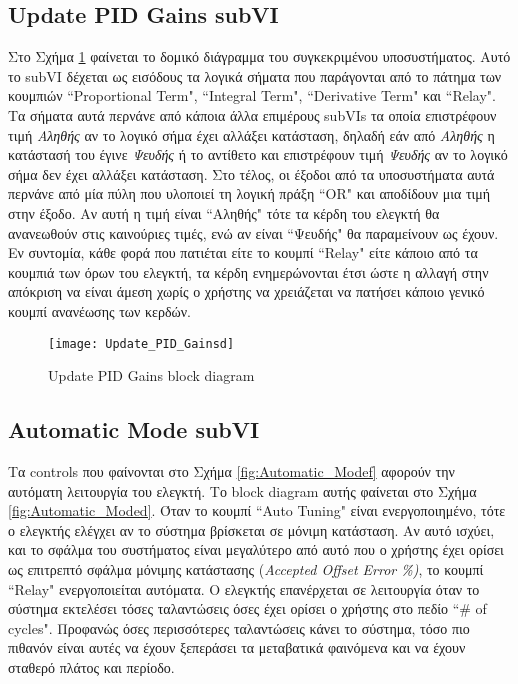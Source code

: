 \subsection{Update PID Gains subVI}

Στο Σχήμα \ref{fig:Update_PID_Gainsd} φαίνεται το δομικό διάγραμμα του συγκεκριμένου υποσυστήματος. Αυτό το subVI δέχεται ως εισόδους τα λογικά σήματα που παράγονται από το πάτημα των κουμπιών ``Proportional Term", ``Integral Term", ``Derivative Term" και ``Relay". Τα σήματα αυτά περνάνε από κάποια άλλα επιμέρους subVIs τα οποία επιστρέφουν τιμή \textit{Αληθής} αν το λογικό σήμα έχει αλλάξει κατάσταση, δηλαδή εάν από \textit{Αληθής} η κατάστασή του έγινε \textit{Ψευδής} ή το αντίθετο και επιστρέφουν τιμή \textit{Ψευδής} αν το λογικό σήμα δεν έχει αλλάξει κατάσταση. Στο τέλος, οι έξοδοι από τα υποσυστήματα αυτά περνάνε από μία πύλη που υλοποιεί τη λογική πράξη ``OR" και αποδίδουν μια τιμή στην έξοδο. Αν αυτή η τιμή είναι ``Αληθής" τότε τα κέρδη του ελεγκτή θα ανανεωθούν στις καινούριες τιμές, ενώ αν είναι ``Ψευδής" θα παραμείνουν ως έχουν. Εν συντομία, κάθε φορά που πατιέται είτε το κουμπί ``Relay" είτε κάποιο από τα κουμπιά των όρων του ελεγκτή, τα κέρδη ενημερώνονται έτσι ώστε η αλλαγή στην απόκριση να είναι άμεση χωρίς ο χρήστης να χρειάζεται να πατήσει κάποιο γενικό κουμπί ανανέωσης των κερδών.

\begin{figure}[h!]
  \centering
  \texttt{[image: Update\_PID\_Gainsd]}
  \caption{Update PID Gains block diagram}
  \label{fig:Update_PID_Gainsd}
\end{figure}

\subsection{Automatic Mode subVI}

Τα controls που φαίνονται στο Σχήμα \ref{fig:Automatic_Modef} αφορούν την αυτόματη λειτουργία του ελεγκτή. Το block diagram αυτής φαίνεται στο Σχήμα \ref{fig:Automatic_Moded}. Όταν το κουμπί ``Auto Tuning" είναι ενεργοποιημένο, τότε ο ελεγκτής ελέγχει αν το σύστημα βρίσκεται σε μόνιμη κατάσταση. Αν αυτό ισχύει, και το σφάλμα του συστήματος είναι μεγαλύτερο από αυτό που ο χρήστης έχει ορίσει ως επιτρεπτό σφάλμα μόνιμης κατάστασης (\emph{Accepted Offset Error \%)}, το κουμπί ``Relay" ενεργοποιείται αυτόματα. Ο ελεγκτής επανέρχεται σε λειτουργία όταν το σύστημα εκτελέσει τόσες ταλαντώσεις όσες έχει ορίσει ο χρήστης στο πεδίο ``\# of cycles". Προφανώς όσες περισσότερες ταλαντώσεις κάνει το σύστημα, τόσο πιο πιθανόν είναι αυτές να έχουν ξεπεράσει τα μεταβατικά φαινόμενα και να έχουν σταθερό πλάτος και περίοδο.

